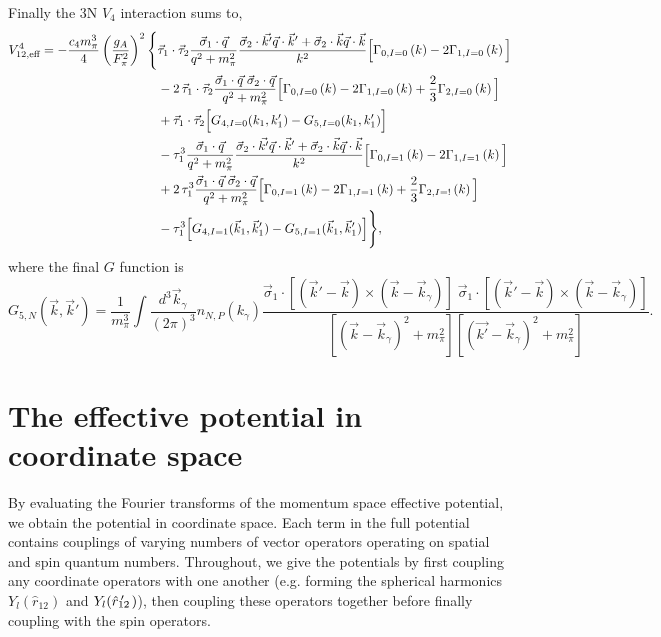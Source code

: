  Finally the 3N $V_4$ interaction sums to,
 \begin{equation}\begin{split}
 \veff^4 = -\frac{c_4 m_\pi^3}{4} \left(\frac{g_A}{F_\pi^2}\right)^2
 \Bigg\{ &\taudot \frac{\vec{\sigma}_1 \cdot \vec{q}}{q^2+m_\pi^2}\frac{\vec{\sigma}_2\cdot\vec{k'}\vec{q}\cdot\vec{k}'+\vec{\sigma}_2\cdot\vec{k}\vec{q}\cdot\vec{k}}{k^2}\Big[\Gam{0}{0}{k}-2\Gam{1}{0}{k}\Big] \\
& - 2\,\taudot\frac{\vec{\sigma}_1 \cdot \vec{q}\;\vec{\sigma}_2 \cdot \vec{q}}{q^2+m_\pi^2}\Big[\Gam{0}{0}{k}-2\Gam{1}{0}{k} +\frac{2}{3}\Gam{2}{0}{k}\Big] \\
& + \taudot\Big[G_{4,I=0}(k_1,k_1')-G_{5,I=0}(k_1,k_1')\Big]\\
%
&-\tau_1^3 \frac{\vec{\sigma}_1 \cdot \vec{q}}{q^2+m_\pi^2}\frac{\vec{\sigma}_2\cdot\vec{k'}\vec{q}\cdot\vec{k}'+\vec{\sigma}_2\cdot\vec{k}\vec{q}\cdot\vec{k}}{k^2}\Big[\Gam{0}{1}{k}-2\Gam{1}{1}{k}\Big] \\
& + 2\,\tau_1^3\frac{\vec{\sigma}_1 \cdot \vec{q}\;\vec{\sigma}_2 \cdot \vec{q}}{q^2+m_\pi^2}\Big[\Gam{0}{1}{k}-2\Gam{1}{1}{k} +\frac{2}{3}\Gam{2}{!}{k}\Big] \\
& - \tau_1^3\Big[G_{4,I=1}(\vec{k}_1,\vec{k}_1')-G_{5,I=1}(\vec{k}_1,\vec{k}_1')\Big]
\Bigg\},
\end{split}
 \end{equation}
 where the final $G$ function is 
 \begin{equation}
 G_{5,N}(\vec{k},\vec{k}')  = \frac{1}{m_\pi^3}\int\frac{d^3\vec{k}_\gamma}{(2\pi)^3} n_{N,P}(k_\gamma) \frac{\vec{\sigma}_1\cdot\left[(\vec{k}'-\vec{k})\times(\vec{k}-\vec{k}_\gamma)\right]\;\vec{\sigma}_1\cdot\left[(\vec{k}'-\vec{k})\times(\vec{k}-\vec{k}_\gamma)\right] }{[(\vec{k}-\vec{k}_\gamma)^2+m_\pi^2][(\vec{k'}-\vec{k}_\gamma)^2+m_\pi^2]}.
 \end{equation}

 
\section{\label{sec:coord}The effective potential in coordinate space}

By evaluating the Fourier transforms of the momentum space effective potential, we obtain the potential in coordinate space. Each term in the full potential contains couplings of varying numbers of vector operators operating on spatial and spin quantum numbers. Throughout, we give the potentials by first coupling any coordinate operators with one another (e.g. forming the spherical harmonics $Y_l(\hat{r}_{12})$ and $Y_l(\hat{r}_{12}\!\!\!\!'\,\,\,)$), then coupling these operators together before finally coupling with the spin operators.

